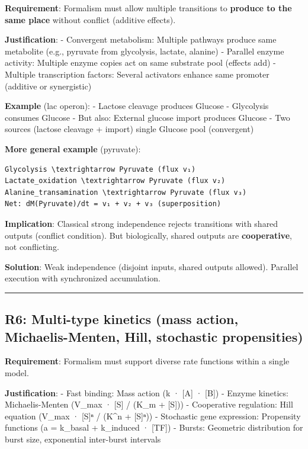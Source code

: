 \textbf{Requirement}: Formalism must allow multiple transitions to
\textbf{produce to the same place} without conflict (additive effects).

\textbf{Justification}: - Convergent metabolism: Multiple pathways
produce same metabolite (e.g., pyruvate from glycolysis, lactate,
alanine) - Parallel enzyme activity: Multiple enzyme copies act on same
substrate pool (effects add) - Multiple transcription factors: Several
activators enhance same promoter (additive or synergistic)

\textbf{Example} (lac operon): - Lactose cleavage produces Glucose -
Glycolysis consumes Glucose - But also: External glucose import produces
Glucose - Two sources (lactose cleavage + import) \textrightarrow single Glucose pool
(convergent)

\textbf{More general example} (pyruvate):

\begin{lstlisting}
Glycolysis \textrightarrow Pyruvate (flux v₁)
Lactate_oxidation \textrightarrow Pyruvate (flux v₂)
Alanine_transamination \textrightarrow Pyruvate (flux v₃)
Net: dM(Pyruvate)/dt = v₁ + v₂ + v₃ (superposition)
\end{lstlisting}

\textbf{Implication}: Classical strong independence rejects transitions
with shared outputs (conflict condition). But biologically, shared
outputs are \textbf{cooperative}, not conflicting.

\textbf{Solution}: Weak independence (disjoint inputs, shared outputs
allowed). Parallel execution with synchronized accumulation.

\begin{center}\rule{0.5\linewidth}{0.5pt}\end{center}

\hypertarget{r6-multi-type-kinetics-mass-action-michaelis-menten-hill-stochastic-propensities}{%
\subsection{\texorpdfstring{\textbf{R6: Multi-type kinetics} (mass
action, Michaelis-Menten, Hill, stochastic
propensities)}{R6: Multi-type kinetics (mass action, Michaelis-Menten, Hill, stochastic propensities)}}\label{r6-multi-type-kinetics-mass-action-michaelis-menten-hill-stochastic-propensities}}

\textbf{Requirement}: Formalism must support diverse rate functions
within a single model.

\textbf{Justification}: - Fast binding: Mass action (k · {[}A{]} ·
{[}B{]}) - Enzyme kinetics: Michaelis-Menten (V\_max · {[}S{]} / (K\_m +
{[}S{]})) - Cooperative regulation: Hill equation (V\_max · {[}S{]}ⁿ /
(K\^{}n + {[}S{]}ⁿ)) - Stochastic gene expression: Propensity functions
(a = k\_basal + k\_induced · {[}TF{]}) - Bursts: Geometric distribution
for burst size, exponential inter-burst intervals

